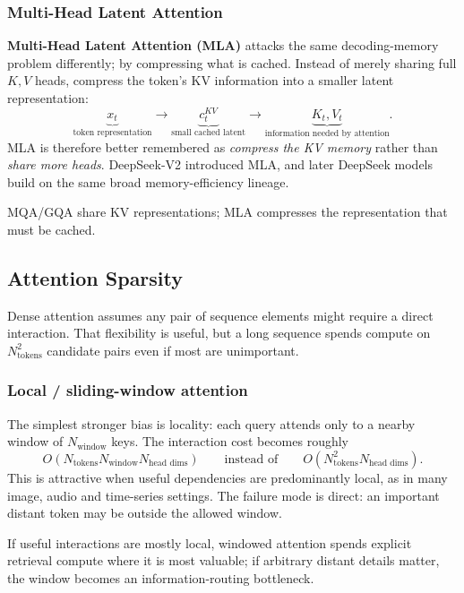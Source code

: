 \subsubsection{Multi-Head Latent Attention}
\textbf{Multi-Head Latent Attention (MLA)} attacks the same decoding-memory problem differently; by compressing what is cached.
Instead of merely sharing full $K,V$ heads, compress the token's KV information into a smaller latent representation:
\[
\underbrace{x_t}_{\text{token representation}}
\longrightarrow
\underbrace{c_t^{KV}}_{\text{small cached latent}}
\longrightarrow
\underbrace{K_t,V_t}_{\text{information needed by attention}}.
\]
MLA is therefore better remembered as \textit{compress the KV memory} rather than \textit{share more heads}.
DeepSeek-V2 introduced MLA, and later DeepSeek models build on the same broad memory-efficiency lineage.

\begin{calloutmemoryhook}
MQA/GQA share KV representations; MLA compresses the representation that must be cached.
\end{calloutmemoryhook}

\subsection{Attention Sparsity}
Dense attention assumes any pair of sequence elements might require a direct interaction.
That flexibility is useful, but a long sequence spends compute on $N_{\text{tokens}}^2$ candidate pairs even if most are unimportant.

\subsubsection{Local / sliding-window attention}
The simplest stronger bias is locality: each query attends only to a nearby window of $N_{\text{window}}$ keys.
The interaction cost becomes roughly
\[
O\!\left(N_{\text{tokens}}N_{\text{window}}N_{\text{head dims}}\right)
\qquad
\text{instead of}
\qquad
O\!\left(N_{\text{tokens}}^2N_{\text{head dims}}\right).
\]
This is attractive when useful dependencies are predominantly local, as in many image, audio and time-series settings.
The failure mode is direct: an important distant token may be outside the allowed window.

\begin{calloutbias}
If useful interactions are mostly local, windowed attention spends explicit retrieval compute where it is most valuable; if arbitrary distant details matter, the window becomes an information-routing bottleneck.
\end{calloutbias}

